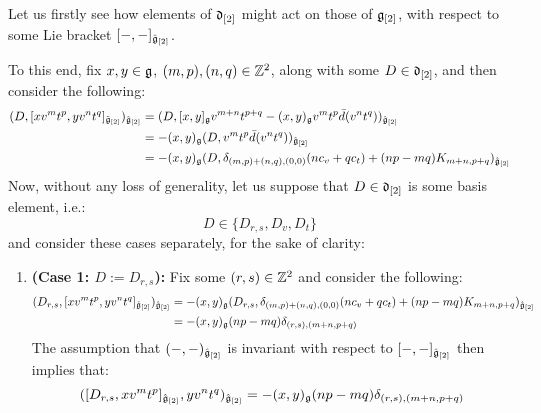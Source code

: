             \begin{remark} \label{remark: derivation_action_on_multiloop_algebras}
                Let us firstly see how elements of $\mathfrak{d}_{[2]}$ might act on those of $\mathfrak{g}_{[2]}$, with respect to some Lie bracket $[-, -]_{\hat{\mathfrak{g}}_{[2]}}$. 

                To this end, fix $x, y \in \mathfrak{g}$, $(m, p), (n, q) \in \mathbb{Z}^2$, along with some $D \in \mathfrak{d}_{[2]}$, and then consider the following:
                    $$
                        \begin{aligned}
                            ( D, [x v^m t^p, y v^n t^q]_{\tilde{\mathfrak{g}}_{[2]}} )_{\hat{\mathfrak{g}}_{[2]}} & = ( D, [x, y]_{\mathfrak{g}} v^{m + n} t^{p + q} - (x, y)_{\mathfrak{g}} v^m t^p \bar{d}( v^n t^q ) )_{\hat{\mathfrak{g}}_{[2]}}
                            \\
                            & = -(x, y)_{\mathfrak{g}} ( D, v^m t^p \bar{d}( v^n t^q ) )_{\hat{\mathfrak{g}}_{[2]}}
                            \\
                            & = -(x, y)_{\mathfrak{g}} ( D, \delta_{(m, p) + (n, q), (0, 0)} ( n c_v + q c_t ) + (np - mq) K_{m + n, p + q} )_{\hat{\mathfrak{g}}_{[2]}}
                        \end{aligned}
                    $$
                Now, without any loss of generality, let us suppose that $D \in \mathfrak{d}_{[2]}$ is some basis element, i.e.:
                    $$D \in \{ D_{r, s}, D_v, D_t \}$$
                and consider these cases separately, for the sake of clarity:
                \begin{enumerate}
                    \item \textbf{(Case 1: $D := D_{r, s}$):} Fix some $(r, s) \in \mathbb{Z}^2$ and consider the following:
                        $$
                            \begin{aligned}
                                ( D_{r, s}, [x v^m t^p, y v^n t^q]_{\tilde{\mathfrak{g}}_{[2]}} )_{\hat{\mathfrak{g}}_{[2]}} & = -(x, y)_{\mathfrak{g}} ( D_{r, s}, \delta_{(m, p) + (n, q), (0, 0)} ( n c_v + q c_t ) + (np - mq) K_{m + n, p + q} )_{\hat{\mathfrak{g}}_{[2]}}
                                \\
                                & = -(x, y)_{\mathfrak{g}} (np - mq) \delta_{(r, s), (m + n, p + q)}
                            \end{aligned}
                        $$
                    The assumption that $(-, -)_{\hat{\mathfrak{g}}_{[2]}}$ is invariant with respect to $[-, -]_{\hat{\mathfrak{g}}_{[2]}}$ then implies that:
                        $$( [D_{r, s}, x v^m t^p]_{\hat{\mathfrak{g}}_{[2]}}, y v^n t^q )_{\hat{\mathfrak{g}}_{[2]}} = -(x, y)_{\mathfrak{g}} (np - mq) \delta_{(r, s), (m + n, p + q)}$$

\end{enumerate}
\end{remark}
